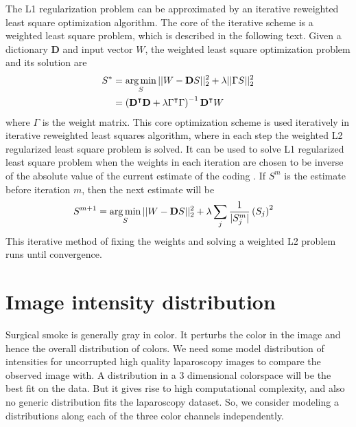 The L1 regularization problem can be approximated by an iterative reweighted least square optimization algorithm. The core of the iterative scheme is a weighted least square problem, which is described in the following text. Given a dictionary $\mathbf{D}$ and input vector $W$, the weighted least square optimization problem and its solution are
\begin{align}
    S^* &= \operatorname*{arg\,min}_{S} || W - \mathbf{D} S ||_2^2 + \lambda || \Gamma S ||_2^2 \label{eqn:wls}\\
    &= \left( \mathbf{D}^\intercal \mathbf{D} + \lambda \Gamma^\intercal \Gamma \right)^{-1} \mathbf{D}^\intercal W \label{eqn:wlsSolution}
\end{align}
where $\Gamma$ is the weight matrix. This core optimization scheme is used iteratively in iterative reweighted least squares algorithm, where in each step the weighted L2 regularized least square problem is solved. It can be used to solve L1 regularized least square problem when the weights in each iteration are chosen to be inverse of the absolute value of the current estimate of the coding \cite{chartrand2008iteratively}. If $S^m$ is the estimate before iteration $m$, then the next estimate will be
\begin{align}
    S^{m+1} &= \operatorname*{arg\,min}_{S} || W - \mathbf{D} S ||_2^2 + \lambda \sum_{j} \frac{1}{| S_j^m |} \left( S_j \right)^2 \label{eqn:irls_l1} 
\end{align}
This iterative method of fixing the weights and solving a weighted L2 problem runs until convergence.



\section{Image intensity distribution}
\label{sec:pcaDist}
Surgical smoke is generally gray in color. It perturbs the color in the image and hence the overall distribution of colors. We need some model distribution of intensities for uncorrupted high quality laparoscopy images to compare the observed image with. A distribution in a 3 dimensional colorspace will be the best fit on the data. But it gives rise to high computational complexity, and also no generic distribution fits the laparoscopy dataset. So, we consider modeling a distributions along each of the three color channels independently.

